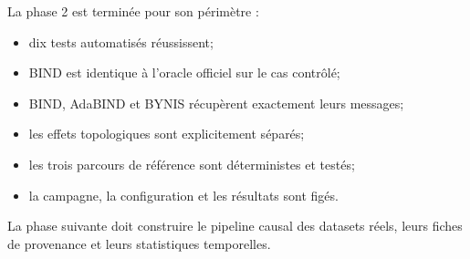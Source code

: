 \documentclass[10pt,a4paper]{article}
\begin{document}
La phase 2 est terminée pour son périmètre :
\begin{itemize}
  \item dix tests automatisés réussissent;
  \item BIND est identique à l'oracle officiel sur le cas contrôlé;
  \item BIND, AdaBIND et BYNIS récupèrent exactement leurs messages;
  \item les effets topologiques sont explicitement séparés;
  \item les trois parcours de référence sont déterministes et testés;
  \item la campagne, la configuration et les résultats sont figés.
\end{itemize}

La phase suivante doit construire le pipeline causal des datasets réels,
leurs fiches de provenance et leurs statistiques temporelles.
\end{document}
